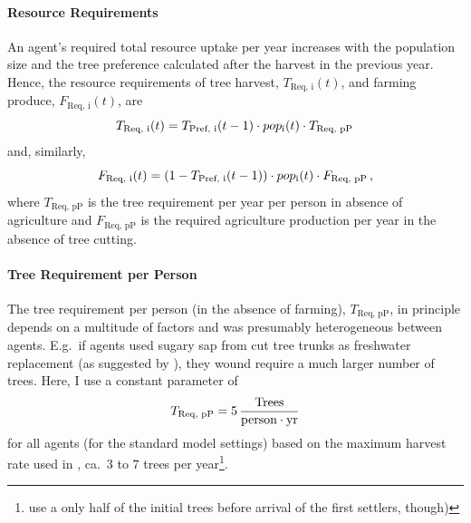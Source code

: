 \paragraph{Resource Requirements}
An agent's required total resource uptake per year increases with the population size and the tree preference calculated after the harvest in the previous year.
Hence, the resource requirements of tree harvest, $T_\text{Req, i}(t)$, and farming produce, $F_\text{Req, i}(t)$, are 
\begin{equation}
T_\text{Req, i}(t) = T_\text{Pref, i}(t-1) \cdot pop_{\rm i}(t) \cdot T_\text{Req, pP} \, 
\end{equation}
and, similarly, 
\begin{equation}
F_\text{Req, i}(t) = (1-T_\text{Pref, i}(t-1)) \cdot pop_{\rm i}(t) \cdot F_\text{Req, pP}\, , 
\end{equation}
where $T_\text{Req, pP}$ is the tree requirement per year per person in absence of agriculture and $F_\text{Req, pP}$ is the required agriculture production per year in the absence of tree cutting.

\paragraph{Tree Requirement per Person}
The tree requirement per person (in the absence of farming), $T_\text{Req, pP}$, in principle depends on a multitude of factors and was presumably heterogeneous between agents.
E.g.\ if agents used sugary sap from cut tree trunks as freshwater replacement (as suggested by \citet{Mieth2015}), they wound require a much larger number of trees.
Here, I use a constant parameter of 
\begin{equation}
T_\text{Req, pP} = 5\, \frac{\text{Trees}}{\rm person\cdot yr}
\end{equation}
for all agents (for the standard model settings) based on the maximum harvest rate used in \citet{Brandt2015}, ca.\ $3$ to $7$ trees per year\footnote{\citet{Brandt2015} use a only half of the initial trees before arrival of the first settlers, though)}. 

